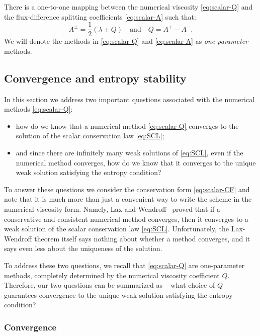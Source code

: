 There is a one-to-one mapping between the numerical viscosity \eqref{eq:scalar-Q} and the flux-difference splitting coefficients \eqref{eq:scalar-A} such that:
\begin{equation} \label{eq:scalar-NV-FDS}
A^{\pm} = \frac{1}{2} \left( \lambda \pm Q \right) \quad \text{and} \quad Q = A^+ - A^-.
\end{equation}
We will denote the methods in \eqref{eq:scalar-Q} and \eqref{eq:scalar-A} as \textit{one-parameter} methods.

\subsection{Convergence and entropy stability}
\label{sec:SCL-FVM-standard-theory}

In this section we address two important questions associated with the numerical methods \eqref{eq:scalar-Q}:
\begin{itemize}
\item how do we know that a numerical method \eqref{eq:scalar-Q} converges to the solution of the scalar conservation law \eqref{eq:SCL};
\item and since there are infinitely many weak solutions of \eqref{eq:SCL}, even if the numerical method converges, how do we know that it converges to the unique weak solution satisfying the entropy condition?
\end{itemize}
To answer these questions we consider the conservation form \eqref{eq:scalar-CF} and note that it is much more than just a convenient way to write the scheme in the numerical viscosity form. Namely, Lax and Wendroff~\cite{lax60} proved that if a conservative and consistent numerical method converges, then it converges to a weak solution of the scalar conservation law \eqref{eq:SCL}. Unfortunately, the Lax-Wendroff theorem itself says nothing about whether a method converges, and it says even less about the uniqueness of the solution.

To address these two questions, we recall that \eqref{eq:scalar-Q} are one-parameter methods, completely determined by the numerical viscosity coefficient $ Q $. Therefore, our two questions can be summarized as -- what choice of $ Q $ guarantees convergence to the unique weak solution satisfying the entropy condition?

\subsubsection*{Convergence} 

